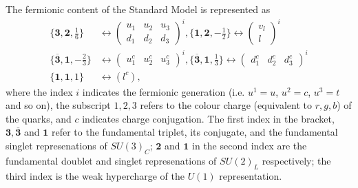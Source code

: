 \documentclass{article}
\begin{document}
The fermionic content of the Standard Model is represented as
\begin{equation}
\begin{split}
\{\bm{3},\bm{2},\frac{1}{6}\} &\leftrightarrow \left( 
\begin{matrix}
u_1 & u_2 & u_3 \\
d_1 & d_2 & d_3
\end{matrix}
\right)^i,  \{\bm{1},\bm{2},-\frac{1}{2}\} \leftrightarrow \left( 
\begin{matrix}
v_l \\
l
\end{matrix}\right)^i \\
\{ \overline{\bm{3}},\bm{1},-\frac{2}{3} \}&\leftrightarrow \left(
\begin{matrix}
u^{c}_1 & u^{c}_{2} & u^{c}_{3}
\end{matrix}\right)^i, \{ \overline{\bm{3}}, \bm{1}, \frac{1}{3} \}\leftrightarrow \left(
\begin{matrix}
d^{c}_1 & d^{c}_2 & d^{c}_3 
\end{matrix}\right)^i \\
\{ \bm{1}, \bm{1}, 1 \} &\leftrightarrow (l^c),
\end{split}
\end{equation}
where the index $i$ indicates the fermionic generation (i.e. $u^1 = u$, $u^2 = c$, $u^3 = t$ and so on), the subscript $1,2,3$ refers to the colour charge (equivalent to $r,g,b$) of the quarks, and $c$ indicates charge conjugation. The first index in the bracket, $\bm{3},\overline{\bm{3}}$ and $\bm{1}$ refer to the fundamental triplet, its conjugate, and the fundamental singlet represenations of $SU(3)_C$; $\bm{2}$ and $\bm{1}$ in the second index are the fundamental doublet and singlet represenations of $SU(2)_L$ respectively; the third index is the weak hypercharge of the $U(1)$ representation.
\end{document}
